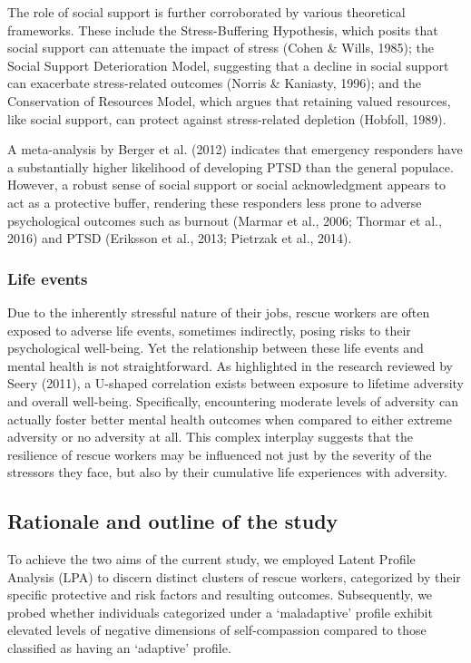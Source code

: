 \documentclass[
  man,floatsintext]{apa7}
\begin{document}
The role of social support is further corroborated by various theoretical frameworks. These include the Stress-Buffering Hypothesis, which posits that social support can attenuate the impact of stress (Cohen \& Wills, 1985); the Social Support Deterioration Model, suggesting that a decline in social support can exacerbate stress-related outcomes (Norris \& Kaniasty, 1996); and the Conservation of Resources Model, which argues that retaining valued resources, like social support, can protect against stress-related depletion (Hobfoll, 1989).

A meta-analysis by Berger et al. (2012) indicates that emergency responders have a substantially higher likelihood of developing PTSD than the general populace. However, a robust sense of social support or social acknowledgment appears to act as a protective buffer, rendering these responders less prone to adverse psychological outcomes such as burnout (Marmar et al., 2006; Thormar et al., 2016) and PTSD (Eriksson et al., 2013; Pietrzak et al., 2014).

\hypertarget{life-events}{%
\subsubsection{Life events}\label{life-events}}

Due to the inherently stressful nature of their jobs, rescue workers are often exposed to adverse life events, sometimes indirectly, posing risks to their psychological well-being. Yet the relationship between these life events and mental health is not straightforward. As highlighted in the research reviewed by Seery (2011), a U-shaped correlation exists between exposure to lifetime adversity and overall well-being. Specifically, encountering moderate levels of adversity can actually foster better mental health outcomes when compared to either extreme adversity or no adversity at all. This complex interplay suggests that the resilience of rescue workers may be influenced not just by the severity of the stressors they face, but also by their cumulative life experiences with adversity.

\hypertarget{rationale-and-outline-of-the-study}{%
\subsection{Rationale and outline of the study}\label{rationale-and-outline-of-the-study}}

To achieve the two aims of the current study, we employed Latent Profile Analysis (LPA) to discern distinct clusters of rescue workers, categorized by their specific protective and risk factors and resulting outcomes. Subsequently, we probed whether individuals categorized under a `maladaptive' profile exhibit elevated levels of negative dimensions of self-compassion compared to those classified as having an `adaptive' profile.
\end{document}
